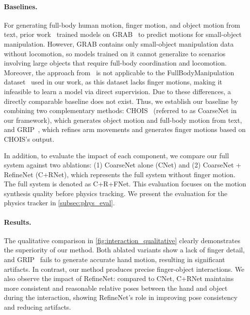 \vspace{-4mm}
\paragraph{Baselines.}
For generating full-body human motion, finger motion, and object motion from text, prior work~\cite{ghosh2022imos,li2024task} trained models on GRAB~\cite{GRAB:2020} to predict motions for small-object manipulation. However, GRAB contains only small-object manipulation data without locomotion, so models trained on it cannot generalize to scenarios involving large objects that require full-body coordination and locomotion. Moreover, the approach from~\cite{ghosh2022imos,li2024task} is not applicable to the FullBodyManipulation dataset~\cite{li2023object} used in our work, as this dataset lacks finger motions, making it infeasible to learn a model via direct supervision. 
Due to these differences, a directly comparable baseline does not exist.
Thus, we establish our baseline by combining two complementary methods: CHOIS~\cite{li2023controllable} (referred to as CoarseNet in our framework), which generates object motion and full-body motion from text, and GRIP~\cite{taheri2023grip}, which refines arm movements and generates finger motions based on CHOIS's output.

In addition, to evaluate the impact of each component, we compare our full system against two ablations: (1) CoarseNet alone (CNet) and (2) CoarseNet + RefineNet (C+RNet), which represents the full system without finger motion. 
The full system is denoted as C+R+FNet.
This evaluation focuses on the motion synthesis quality before physics tracking. We present the evaluation for the physics tracker in \cref{subsec:phys_eval}.


\vspace{-4mm}
\paragraph{Results.}
The qualitative comparison in \cref{fig:interaction_qualitative} clearly demonstrates the superiority of our method. Both ablated variants show a lack of finger detail, and GRIP~\cite{taheri2023grip} fails to generate accurate hand motion, resulting in significant artifacts. In contrast, our method produces precise finger-object interactions.
We also observe the impact of RefineNet: compared to CNet, C+RNet maintains more consistent and reasonable relative poses between the hand and object during the interaction, showing RefineNet’s role in improving pose consistency and reducing artifacts.

